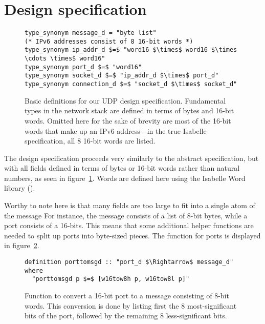 \documentclass[twoside]{memoir}
\begin{document}
\section{Design specification}

\begin{figure}[htpb]
    \centering
\begin{lstlisting}[language=isabelle]
type_synonym message_d = "byte list"
(* IPv6 addresses consist of 8 16-bit words *)
type_synonym ip_addr_d $=$ "word16 $\times$ word16 $\times \cdots \times$ word16"
type_synonym port_d $=$ "word16"
type_synonym socket_d $=$ "ip_addr_d $\times$ port_d"
type_synonym connection_d $=$ "socket_d $\times$ socket_d"
\end{lstlisting}
    \caption{Basic definitions for our UDP design specification.
    Fundamental types in the network stack are defined
    in terms of bytes and 16-bit words.
    Omitted here for the sake of brevity are most of the 16-bit words
    that make up an IPv6 address---in the true Isabelle specification,
    all 8 16-bit words are listed.}
    \label{fig:defs-design}
\end{figure}

The design specification proceeds very similarly to the abstract specification,
but with all fields defined in terms of bytes or 16-bit words rather than
natural numbers, as seen in figure~\ref{fig:defs-design}.
Words are defined here using the Isabelle Word library
(\cite{Word_Lib-AFP}).

Worthy to note here is that many fields are too large to fit into
a single atom of the message
For instance, the message consists of a list of
8-bit bytes, while a port consists of a 16-bits.
This means that some additional helper functions are needed
to split up ports into byte-sized pieces.
The function for ports is displayed in figure~\ref{fig:porttomsg-design}.

\begin{figure}[htpb]
    \centering
\begin{lstlisting}[language=isabelle]
definition porttomsgd :: "port_d $\Rightarrow$ message_d" where
  "porttomsgd p $=$ [w16tow8h p, w16tow8l p]"
\end{lstlisting}
    \caption{Function to convert a 16-bit port to a message
        consisting of 8-bit words.
        This conversion is done by listing first the 8
        most-significant bits of the port, followed by
        the remaining 8 less-significant bits.}
    \label{fig:porttomsg-design}
\end{figure}
\end{document}
